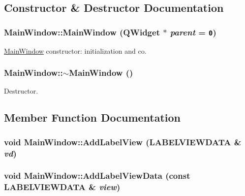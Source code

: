 \subsection{Constructor \& Destructor Documentation}
\hypertarget{class_main_window_8b244be8b7b7db1b08de2a2acb9409db}{
\subsubsection[{MainWindow}]{\setlength{\rightskip}{0pt plus 5cm}MainWindow::MainWindow (QWidget $\ast$ {\em parent} = {\tt 0})}}
\label{class_main_window_8b244be8b7b7db1b08de2a2acb9409db}


\hyperlink{class_main_window}{MainWindow} constructor: initialization and co. 

\hypertarget{class_main_window_e98d00a93bc118200eeef9f9bba1dba7}{
\subsubsection[{$\sim$MainWindow}]{\setlength{\rightskip}{0pt plus 5cm}MainWindow::$\sim$MainWindow ()}}
\label{class_main_window_e98d00a93bc118200eeef9f9bba1dba7}


Destructor. 



\subsection{Member Function Documentation}
\hypertarget{class_main_window_a1f10b2834cc0664f8a9af0bb07b55b9}{
\subsubsection[{AddLabelView}]{\setlength{\rightskip}{0pt plus 5cm}void MainWindow::AddLabelView ({\bf LABELVIEWDATA} \& {\em vd})}}
\label{class_main_window_a1f10b2834cc0664f8a9af0bb07b55b9}


\hypertarget{class_main_window_f8767e75b767be1e6d95491efbc75678}{
\subsubsection[{AddLabelViewData}]{\setlength{\rightskip}{0pt plus 5cm}void MainWindow::AddLabelViewData (const {\bf LABELVIEWDATA} \& {\em view})}}
\label{class_main_window_f8767e75b767be1e6d95491efbc75678}


